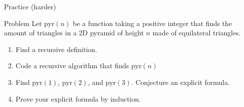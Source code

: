 \documentclass[dvipsnames,t]{beamer}
\begin{document}
\begin{frame}{Practice (harder)}
\begin{block}{Problem}
Let $\text{pyr}(n)$ be a function taking a positive integer that finds the amount of triangles in a 2D pyramid of height $n$ made of equilateral triangles.
\begin{enumerate}
    \item Find a recursive definition.
    \item Code a recursive algorithm  that finds $\text{pyr}(n)$
    \item Find $\text{pyr}(1)$, $\text{pyr}(2)$, and $\text{pyr}(3)$. Conjecture an explicit formula.
    \item Prove your explicit formula by induction.

\end{enumerate}
\end{block}
\end{frame}
\end{document}
